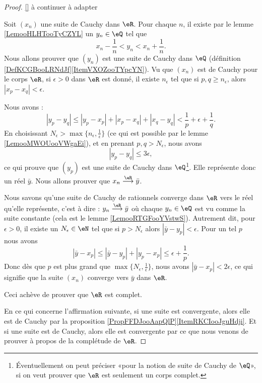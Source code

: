\begin{proof}

    \ref{} à continuer à adapter

    Soit \( (x_n)\) une suite de Cauchy dans \( \eR\). Pour chaque \( n\), il existe par le lemme \ref{LemooHLHTooTyCZYL} un \( y_n\in \eQ\) tel que 
    \begin{equation}
        x_n-\frac{1}{ n }<y_n<x_n+\frac{1}{ n }.
    \end{equation}
    Nous allons prouver que \( (y_n)\) est une suite de Cauchy dans \( \eQ\) (définition \ref{DefKCGBooLRNdJf}\ref{ItemVXOZooTYpcYN}). Vu que \( (x_n)\) est de Cauchy pour le corps \( \eR\), si \( \epsilon>0\) dans \( \eR\) est donné, il existe \( n_{\epsilon}\) tel que si \( p,q\geq n_{\epsilon}\), alors \( | x_p-x_q |<\epsilon\).

    Nous avons :
    \begin{equation}
        | y_p-y_q |\leq | y_p-x_p |+| x_p-x_q |+| x_q-y_q |<\frac{1}{ p }+\epsilon+\frac{1}{ q }.
    \end{equation}
    En choisissant \( N_{\epsilon}>\max\{ n_{\epsilon},\frac{1}{ \epsilon } \}\) (ce qui est possible par le lemme \ref{LemooMWOUooVWgaEi}), et en prenant \( p,q>N_{\epsilon}\), nous avons
    \begin{equation}
        | y_p-y_q |\leq 3\epsilon,
    \end{equation}
    ce qui prouve que \( (y_p)\) est une suite de Cauchy dans \( \eQ\)\footnote{Éventuellement on peut préciser «pour la notion de suite de Cauchy de \( \eQ\)», si on veut prouver que \( \eR\) est seulement  un corps complet.}. Elle représente donc un réel \( \bar y\). Nous allons prouver que \(     x_n\stackrel{\eR}{\longrightarrow}\bar y \).

    Nous savons qu'une suite de Cauchy de rationnels converge dans \( \eR\) vers le réel qu'elle représente, c'est à dire : \( y_n\stackrel{\eR}{\longrightarrow}\bar y\) où chaque \( y_n\in \eQ\) est vu comme la suite constante (cela est le lemme \ref{LemooRTGFooYVstwS}). Autrement dit, pour \( \epsilon>0\), il existe un \( N_{\epsilon}\in \eN\) tel que si \( p>N_{\epsilon}\) alors \( | \bar y-y_p |<\epsilon\). Pour un tel \( p\) nous avons
    \begin{equation}
        | \bar y-x_p |\leq| \bar y-y_p |+| y_p-x_p |\leq \epsilon+\frac{1}{ p }.
    \end{equation}
    Donc dès que \( p\) est plus grand que \( \max\{ N_{\epsilon},\frac{1}{ \epsilon } \}\), nous avons \( | \bar y-x_p |<2\epsilon\), ce qui signifie que la suite \( (x_n) \) converge vers \( \bar y\) dans \( \eR\).

    Ceci achève de prouver que \( \eR\) est complet.

    En ce qui concerne l'affirmation suivante, si une suite est convergente, alors elle est de Cauchy par la proposition \ref{PropFFDJooAapQlP}\ref{ItemRKCIooJguHdji}. Et si une suite est de Cauchy, alors elle est convergente par ce que nous venons de prouver à propos de la complétude de \( \eR\).
\end{proof}


